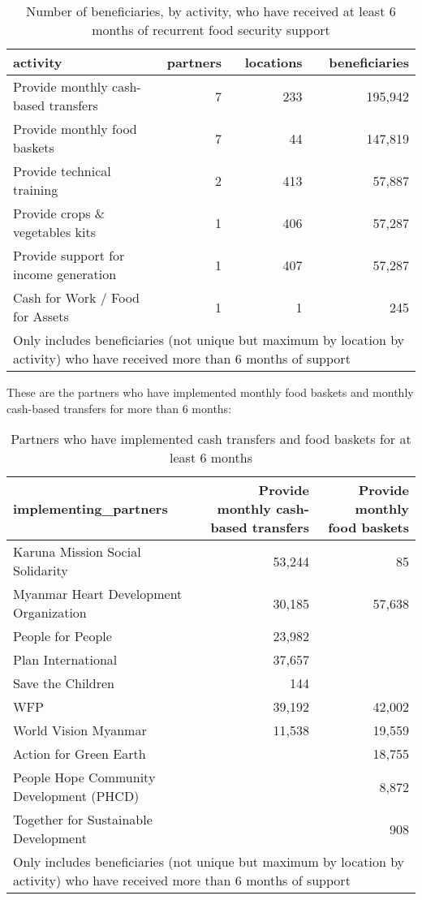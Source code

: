 \documentclass[
]{article}
\begin{document}
\begin{table}

\caption{\label{tab:table-monthly-activities-6-9-months}Number of beneficiaries, by activity, who have received at least 6 months of recurrent food security support}
\centering
\begin{tabular}[t]{l|r|r|r}
\hline
activity & partners & locations & beneficiaries\\
\hline
Provide monthly cash-based transfers & 7 & 233 & 195,942\\
\hline
Provide monthly food baskets & 7 & 44 & 147,819\\
\hline
Provide technical training & 2 & 413 & 57,887\\
\hline
Provide crops \& vegetables kits & 1 & 406 & 57,287\\
\hline
Provide support for income generation & 1 & 407 & 57,287\\
\hline
Cash for Work / Food for Assets & 1 & 1 & 245\\
\hline
\multicolumn{4}{l}{\rule{0pt}{1em}Only includes beneficiaries (not unique but maximum by location by activity) who have received more than 6 months of support}\\
\end{tabular}
\end{table}

These are the partners who have implemented monthly food baskets and
monthly cash-based transfers for more than 6 months:

\begin{table}

\caption{\label{tab:table-partners-6-months}Partners who have implemented cash transfers and food baskets for at least 6 months}
\centering
\begin{tabular}[t]{l|r|r}
\hline
implementing\_partners & Provide monthly cash-based transfers & Provide monthly food baskets\\
\hline
Karuna Mission Social Solidarity & 53,244 & 85\\
\hline
Myanmar Heart Development Organization & 30,185 & 57,638\\
\hline
People for People & 23,982 & \\
\hline
Plan International & 37,657 & \\
\hline
Save the Children & 144 & \\
\hline
WFP & 39,192 & 42,002\\
\hline
World Vision Myanmar & 11,538 & 19,559\\
\hline
Action for Green Earth &  & 18,755\\
\hline
People Hope Community Development (PHCD) &  & 8,872\\
\hline
Together for Sustainable Development &  & 908\\
\hline
\multicolumn{3}{l}{\rule{0pt}{1em}Only includes beneficiaries (not unique but maximum by location by activity) who have received more than 6 months of support}\\
\end{tabular}
\end{table}
\end{document}
